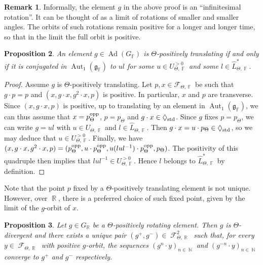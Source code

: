 \documentclass{amsart}
\theoremstyle{plain}
\newtheorem{proposition}{Proposition}[section]
\theoremstyle{definition}
\newtheorem{remark}[proposition]{Remark}
\DeclareMathOperator{\Aut}{Aut}
\DeclareMathOperator{\Ad}{Ad}
\DeclareMathOperator{\Diam}{\lozenge}
\DeclareMathOperator{\Fc}{\mathcal{F}}
\DeclareMathOperator{\Fb}{{\mathbb{F}}}
\DeclareMathOperator{\Nb}{{\mathbb{N}}}
\DeclareMathOperator{\Rb}{{\mathbb{R}}}
\newcommand{\opp}{\textnormal{opp}}
\newcommand{\std}{\textnormal{std}}
\newcommand{\1}{\mathbf{1}}
\begin{document}
\begin{remark}
\label{rem: infinitesimal rotation}
    Informally, the element $g$ in the above proof is an ``infinitesimal rotation''. It can be thought of as a limit of rotations of smaller and smaller angles. The orbits of such rotations remain positive for a longer and longer time, so that in the limit the full orbit is positive.
\end{remark}


\begin{proposition}\label{propo: PosTransUL}
    An element $g \in \Ad(G_{\Fb})$ is $\Theta$-positively translating if and only if it  is conjugated in $\Aut_1(\mathfrak{g}_{\Fb})$ to $ul$ for some $u\in U_{\Theta,\Fb}^{>0}$ and some $l\in \hat{L}_{\Theta,\Fb}^*$.
\end{proposition}
\begin{proof}
    Assume $g$ is $\Theta$-positively translating. Let $p,x\in \mathcal F_{\Theta,\Fb}$ be such that $g\cdot p = p$ and $(x,g\cdot x, g^2 \cdot x, p)$ is positive.
    In particular, $x$ and $p$ are transverse.
    Since $(x,g\cdot x, p)$ is positive, up to translating by an element in $\Aut_1(\mathfrak g_{\Fb})$, we can thus assume that $x= p_{\Theta}^\opp$, $p = p_\Theta$ and $g\cdot x \in \Diam_\std$.
    Since $g$ fixes $p = p_\Theta$, we can write $g=ul$ with $u\in U_{\Theta,\Fb}$ and $l\in \hat{L}_{\Theta,\Fb}$.
    Then $g\cdot x = u\cdot p_\Theta \in \Diam_\std$, so we may deduce that $u \in U_{\Theta,\Fb}^{>0}$.
    Finally, we have $(x, g\cdot x, g^2 \cdot x, p) = (p_\Theta^\opp, u\cdot p_\Theta^\opp, u (lul^{-1}) \cdot p_\Theta^\opp, p_\Theta)$.
    The positivity of this quadruple then implies that $lul^{-1} \in U_{\Theta,\Fb}^{>0}$.
    Hence $l$ belongs to $\hat{L}_{\Theta,\Fb}^*$ by definition.
\end{proof}

Note that the point $p$ fixed by a $\Theta$-positively translating element is not unique. However, over $\Rb$, there is a preferred choice of such fixed point, given by the limit of the $g$-orbit of $x$.

\begin{proposition}
\label{propo: OverRPosRotImpliesDiv}
    Let $g\in G_{\Rb}$ be a $\Theta$-positively rotating element. Then $g$ is $\Theta$-divergent and there exists a unique pair $(g^+,g^-)\in \Fc_{\Theta,\Rb}^2$ such that, for every $y\in \Fc_{\Theta,\Rb}$ with positive $g$-orbit, the sequences $(g^n\cdot y)_{n\in\Nb}$ and $(g^{-n}\cdot y)_{n\in\Nb}$ converge to $g^+$ and $g^-$ respectively.
\end{proposition}
\end{document}
